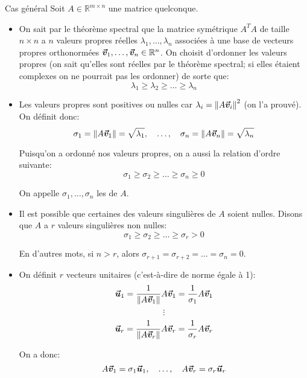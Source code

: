 \documentclass[a4paper]{article}
\begin{document}
\begin{parag}{Cas général}
    Soit $A \in \mathbb{R}^{m\times n}$ une matrice quelconque.

    \begin{itemize}[left=0pt]
        \item On sait par le théorème spectral que la matrice symétrique $A^T A$ de taille $n \times n$ a $n$ valeurs propres réelles $\lambda_1, \ldots, \lambda_n$ associées à une base de vecteurs propres orthonormées $\bm{\protect\vec{v}}_1, \ldots, \bm{\protect\vec{v}}_n \in \mathbb{R}^{n}$. On choisit d'ordonner les valeurs propres (on sait qu'elles sont réelles par le théorème spectral; si elles étaient complexes on ne pourrait pas les ordonner) de sorte que:
        \[\lambda_1 \geq \lambda_2 \geq \ldots \geq \lambda_n\]

    \item Les valeurs propres sont positives ou nulles car $\lambda_i = \left\|A \bvec{v}_i\right\|^2$ (on l'a prouvé). On définit donc:
    \[\sigma_1 = \left\|A \bvec{v}_1\right\| = \sqrt{\lambda_1}, \mathspace \ldots, \mathspace \sigma_n = \left\|A \bvec{v}_n\right\| = \sqrt{\lambda_n}\]

    Puisqu'on a ordonné nos valeurs propres, on a aussi la relation d'ordre suivante:
    \[\sigma_1 \geq \sigma_2 \geq \ldots \geq \sigma_n \geq 0\]

    On appelle $\sigma_1, \ldots, \sigma_n$ les  de $A$.
    \item Il est possible que certaines des valeurs singulières de $A$ soient nulles. Disons que $A$ a $r$ valeurs singulières non nulles:
    \[\sigma_1 \geq \sigma_2 \geq \ldots \geq \sigma_r > 0\]

    En d'autres mots, si $n > r$, alors $\sigma_{r + 1} = \sigma_{r+2} = \ldots = \sigma_n = 0$.
    \item On définit $r$ vecteurs unitaires (c'est-à-dire de norme égale à 1):
    \[\bvec{u}_1 = \frac{1}{\left\|A \bvec{v}_1\right\|} A \bvec{v}_1 = \frac{1}{\sigma_1} A \bvec{v}_1\]
    \[\vdots\]
    \[\bvec{u}_r = \frac{1}{\left\|A \bvec{v}_r\right\|} A \bvec{v}_r = \frac{1}{\sigma_r} A \bvec{v}_r\]

    On a donc:
    \[A \bm{\protect\vec{v}}_1 = \sigma_1 \bm{\protect\vec{u}}_1, \quad \ldots, \quad A \bm{\protect\vec{v}}_r = \sigma_r \bm{\protect\vec{u}}_r\]


\end{itemize}
\end{parag}
\end{document}
